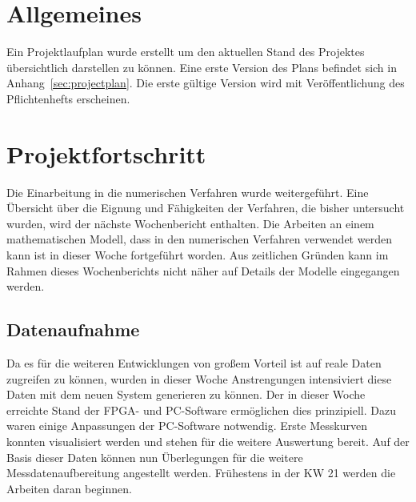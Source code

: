 \documentclass[a4paper,12pt,fleqn]{article}
\begin{document}
\setlength{\headheight}{36pt}

\begin{titlepage}



\end{titlepage}

\section[Allgemeines]{Allgemeines}
Ein Projektlaufplan wurde erstellt um den aktuellen Stand des Projektes übersichtlich darstellen zu können. Eine erste Version des Plans befindet sich in Anhang~\ref{sec:projectplan}. Die erste gültige Version wird mit Veröffentlichung des Pflichtenhefts erscheinen.

\section[Fortschritt]{Projektfortschritt}
Die Einarbeitung in die numerischen Verfahren wurde weitergeführt. Eine Übersicht über die Eignung und Fähigkeiten der Verfahren, die bisher untersucht wurden, wird der nächste Wochenbericht enthalten. Die Arbeiten an einem mathematischen Modell, dass in den numerischen Verfahren verwendet werden kann ist in dieser Woche fortgeführt worden. Aus zeitlichen Gründen kann im Rahmen dieses Wochenberichts nicht näher auf Details der Modelle eingegangen werden.

\subsection{Datenaufnahme}
Da es für die weiteren Entwicklungen von großem Vorteil ist auf reale Daten zugreifen zu können, wurden in dieser Woche Anstrengungen intensiviert diese Daten mit dem neuen System generieren zu können. Der in dieser Woche erreichte Stand der FPGA- und PC-Software ermöglichen dies prinzipiell. Dazu waren einige Anpassungen der PC-Software notwendig. Erste Messkurven konnten visualisiert werden und stehen für die weitere Auswertung bereit. Auf der Basis dieser Daten können nun Überlegungen für die weitere Messdatenaufbereitung angestellt werden. Frühestens in der KW 21 werden die Arbeiten daran beginnen.
\end{document}
